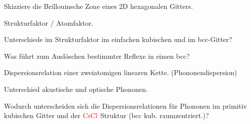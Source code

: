 \documentclass[a5paper,12pt,ngerman,grid=front %
,print
]{kartei}
\let\oldce\ce
\renewcommand*{\ce}[1]{\begingroup\color{red}\oldce{#1}\endgroup}
\begin{document}
	\begin{karte}{
		Skizziere die Brillouinsche Zone eines 2D hexagonalen Gitters.
		}
		
		
		
	\end{karte}


	\begin{karte}{
		Strukturfaktor / Atomfaktor.
		}
		
		
		
	\end{karte}


	\begin{karte}{
		Unterschiede im Strukturfaktor im einfachen kubischen und im bcc-Gitter?
		}
		
		
		
	\end{karte}


	\begin{karte}{
		Was führt zum Auslöschen bestimmter Reflexe in eimen bcc?
		}
		
		
		
	\end{karte}


	\begin{karte}{
		Dispersionsrelation einer zweiatomigen linearen Kette. (Phononendispersion)
		}
		
		
		
	\end{karte}


	\begin{karte}{
		Unterschied akustische und optische Phononen.
		}
		
		
		
	\end{karte}


	\begin{karte}{
		Wodurch unterscheiden sich die Dispersionsrelationen für Phononen im primitiv 
		kubischen Gitter und der $\ce{CsCl}$ Struktur (bcc kub. raumzentriert.)?
		}
		
		
		
	\end{karte}
\end{document}
